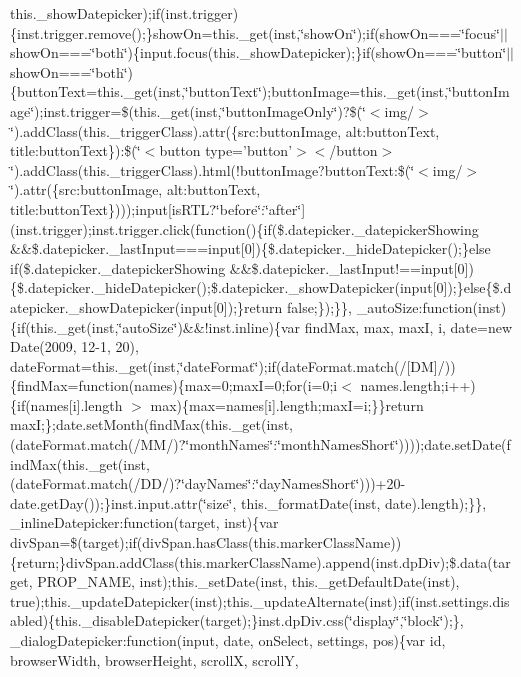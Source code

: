 {{\begin{DoxyParamCaption}
this.\+\_\+show\+Datepicker);if(inst.\+trigger)\{inst.\+trigger.\+remove();\}show\+On=this.\+\_\+get(inst,\char`\"{}show\+On\char`\"{});if(show\+On===\char`\"{}focus\char`\"{}$\vert$$\vert$show\+On===\char`\"{}both\char`\"{})\{input.\+focus(this.\+\_\+show\+Datepicker);\}if(show\+On===\char`\"{}button\char`\"{}$\vert$$\vert$show\+On===\char`\"{}both\char`\"{})\{button\+Text=this.\+\_\+get(inst,\char`\"{}button\+Text\char`\"{});button\+Image=this.\+\_\+get(inst,\char`\"{}button\+Image\char`\"{});inst.\+trigger=\$(this.\+\_\+get(inst,\char`\"{}button\+Image\+Only\char`\"{})?\$(\char`\"{}$<$img/$>$\char`\"{}).\+add\+Class(this.\+\_\+trigger\+Class).\+attr(\{src\+:button\+Image, alt\+:button\+Text, title\+:button\+Text\})\+:\$(\char`\"{}$<$button type='button'$>$$<$/button$>$\char`\"{}).\+add\+Class(this.\+\_\+trigger\+Class).\+html(!button\+Image?button\+Text\+:\$(\char`\"{}$<$img/$>$\char`\"{}).\+attr(\{src\+:button\+Image, alt\+:button\+Text, title\+:button\+Text\})));input\mbox{[}is\+R\+T\+L?\char`\"{}before\char`\"{}\+:\char`\"{}after\char`\"{}\mbox{]}(inst.\+trigger);inst.\+trigger.\+click(function()\{if(\$.\+datepicker.\+\_\+datepicker\+Showing \&\&\$.\+datepicker.\+\_\+last\+Input===input\mbox{[}0\mbox{]})\{\$.\+datepicker.\+\_\+hide\+Datepicker();\}else if(\$.\+datepicker.\+\_\+datepicker\+Showing \&\&\$.\+datepicker.\+\_\+last\+Input!==input\mbox{[}0\mbox{]})\{\$.\+datepicker.\+\_\+hide\+Datepicker();\$.\+datepicker.\+\_\+show\+Datepicker(input\mbox{[}0\mbox{]});\}else\{\$.\+datepicker.\+\_\+show\+Datepicker(input\mbox{[}0\mbox{]});\}return false;\});\}\}, \+\_\+auto\+Size\+:function(inst)\{if(this.\+\_\+get(inst,\char`\"{}auto\+Size\char`\"{})\&\&!inst.\+inline)\{var find\+Max, max, max\+I, i, date=new Date(2009, 12-\/1, 20), date\+Format=this.\+\_\+get(inst,\char`\"{}date\+Format\char`\"{});if(date\+Format.\+match(/\mbox{[}\+D\+M\mbox{]}/))\{find\+Max=function(names)\{max=0;max\+I=0;for(i=0;i$<$ names.\+length;i++)\{if(names\mbox{[}i\mbox{]}.\+length $>$ max)\{max=names\mbox{[}i\mbox{]}.\+length;max\+I=i;\}\}return max\+I;\};date.\+set\+Month(find\+Max(this.\+\_\+get(inst,(date\+Format.\+match(/\+M\+M/)?\char`\"{}month\+Names\char`\"{}\+:\char`\"{}month\+Names\+Short\char`\"{}))));date.\+set\+Date(find\+Max(this.\+\_\+get(inst,(date\+Format.\+match(/\+D\+D/)?\char`\"{}day\+Names\char`\"{}\+:\char`\"{}day\+Names\+Short\char`\"{})))+20-\/date.\+get\+Day());\}inst.\+input.\+attr(\char`\"{}size\char`\"{}, this.\+\_\+format\+Date(inst, date).\+length);\}\}, \+\_\+inline\+Datepicker\+:function(target, inst)\{var div\+Span=\$(target);if(div\+Span.\+has\+Class(this.\+marker\+Class\+Name))\{return;\}div\+Span.\+add\+Class(this.\+marker\+Class\+Name).\+append(inst.\+dp\+Div);\$.\+data(target, P\+R\+O\+P\+\_\+\+N\+A\+M\+E, inst);this.\+\_\+set\+Date(inst, this.\+\_\+get\+Default\+Date(inst), true);this.\+\_\+update\+Datepicker(inst);this.\+\_\+update\+Alternate(inst);if(inst.\+settings.\+disabled)\{this.\+\_\+disable\+Datepicker(target);\}inst.\+dp\+Div.\+css(\char`\"{}display\char`\"{},\char`\"{}block\char`\"{});\}, \+\_\+dialog\+Datepicker\+:function(input, date, on\+Select, settings, pos)\{var id, browser\+Width, browser\+Height, scroll\+X, scroll\+Y, 
\end{DoxyParamCaption}}}
